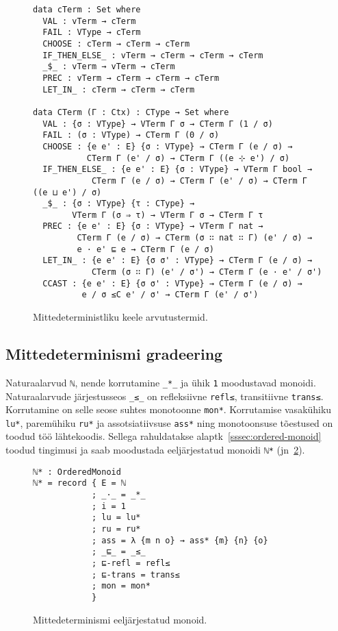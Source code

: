 \documentclass[a4paper,12pt]{article}
\begin{document}
\begin{figure}
  \begin{BVerbatim}
data cTerm : Set where
  VAL : vTerm → cTerm
  FAIL : VType → cTerm
  CHOOSE : cTerm → cTerm → cTerm
  IF_THEN_ELSE_ : vTerm → cTerm → cTerm → cTerm
  _$_ : vTerm → vTerm → cTerm
  PREC : vTerm → cTerm → cTerm → cTerm
  LET_IN_ : cTerm → cTerm → cTerm

data CTerm (Γ : Ctx) : CType → Set where
  VAL : {σ : VType} → VTerm Γ σ → CTerm Γ (1 / σ)
  FAIL : (σ : VType) → CTerm Γ (0 / σ)
  CHOOSE : {e e' : E} {σ : VType} → CTerm Γ (e / σ) →
           CTerm Γ (e' / σ) → CTerm Γ ((e ⊹ e') / σ)
  IF_THEN_ELSE_ : {e e' : E} {σ : VType} → VTerm Γ bool →
            CTerm Γ (e / σ) → CTerm Γ (e' / σ) → CTerm Γ ((e ⊔ e') / σ)
  _$_ : {σ : VType} {τ : CType} →
        VTerm Γ (σ ⇒ τ) → VTerm Γ σ → CTerm Γ τ
  PREC : {e e' : E} {σ : VType} → VTerm Γ nat →
         CTerm Γ (e / σ) → CTerm (σ ∷ nat ∷ Γ) (e' / σ) →
         e · e' ⊑ e → CTerm Γ (e / σ)
  LET_IN_ : {e e' : E} {σ σ' : VType} → CTerm Γ (e / σ) →
            CTerm (σ ∷ Γ) (e' / σ') → CTerm Γ (e · e' / σ')
  CCAST : {e e' : E} {σ σ' : VType} → CTerm Γ (e / σ) →
          e / σ ≤C e' / σ' → CTerm Γ (e' / σ')

  \end{BVerbatim}
  \caption{Mittedeterministliku keele arvutustermid.}
  \label{fig:nd.cterms}
\end{figure}


\subsection{Mittedeterminismi gradeering}\label{ssec:nd.grading}

Naturaalarvud {\tt ℕ}, nende korrutamine {\tt _*_} ja ühik {\tt 1} moodustavad monoidi.
Naturaalarvude järjestusseos {\tt _≤_} on refleksiivne {\tt refl≤}, transitiivne {\tt trans≤}. Korrutamine on selle seose suhtes monotoonne {\tt mon*}.
Korrutamise vasakühiku {\tt lu*}, paremühiku {\tt ru*} ja assotsiatiivsuse {\tt ass*} ning monotoonsuse tõestused on toodud töö lähtekoodis.
Sellega rahuldatakse alaptk~\ref{sssec:ordered-monoid} toodud tingimusi ja saab moodustada eeljärjestatud monoidi {\tt ℕ*} (jn~\ref{fig:nd.ordered-monoid}).
\begin{figure}
  \begin{BVerbatim}
ℕ* : OrderedMonoid
ℕ* = record { E = ℕ
            ; _·_ = _*_
            ; i = 1
            ; lu = lu*
            ; ru = ru*
            ; ass = λ {m n o} → ass* {m} {n} {o}
            ; _⊑_ = _≤_
            ; ⊑-refl = refl≤
            ; ⊑-trans = trans≤
            ; mon = mon*
            }
  \end{BVerbatim}
  \caption{Mittedeterminismi eeljärjestatud monoid.}
  \label{fig:nd.ordered-monoid}
\end{figure}
\end{document}
